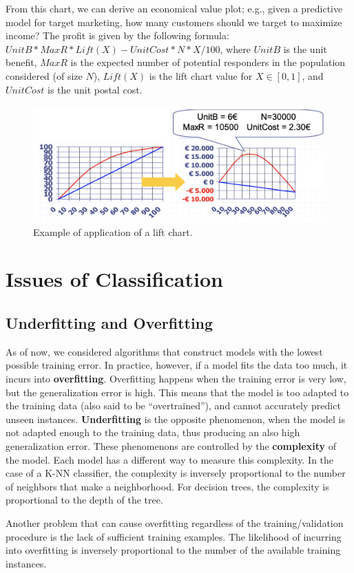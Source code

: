 From this chart, we can derive an economical value plot; e.g., given a predictive model for target marketing, how many customers should we target to maximize income? The profit is given by the following formula: $UnitB * MaxR * Lift(X) - UnitCost*N*X/100$, where $UnitB$ is the unit benefit, $MaxR$ is the expected number of potential responders in the population considered (of size $N$), $Lift(X)$ is the lift chart value for $X \in [0,1]$, and $UnitCost$ is the unit postal cost.

\begin{figure}
    \centering
    \includegraphics[width=0.5\linewidth]{img/Lift chart application.png}
    \caption{Example of application of a lift chart.}
\end{figure}


\section{Issues of Classification}

\subsection{Underfitting and Overfitting}

As of now, we considered algorithms that construct models with the lowest possible training error. In practice, however, if a model fits the data too much, it incurs into \textbf{overfitting}. Overfitting happens when the training error is very low, but the generalization error is high. This means that the model is too adapted to the training data (also said to be ``overtrained''), and cannot accurately predict unseen instances. \textbf{Underfitting} is the opposite phenomenon, when the model is not adapted enough to the training data, thus producing an also high generalization error. These phenomenons are controlled by the \textbf{complexity} of the model. Each model has a different way to measure this complexity. In the case of a K-NN classifier, the complexity is inversely proportional to the number of neighbors that make a neighborhood. For decision trees, the complexity is proportional to the depth of the tree.

Another problem that can cause overfitting regardless of the training/validation procedure is the lack of sufficient training examples. The likelihood of incurring into overfitting is inversely proportional to the number of the available training instances. 

